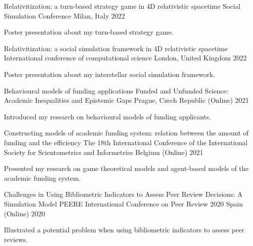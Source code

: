 \begin{cventries}
  \cventry
    {Relativitization: a turn-based strategy game in 4D relativistic spacetime} %
    {Social Simulation Conference} %
    {Milan, Italy} %
    {2022} %
    {
      \begin{cvitems} %
        \item {Poster presentation about my turn-based strategy game.}
      \end{cvitems}
    }

  \cventry
    {Relativitization: a social simulation framework in 4D relativistic spacetime} %
    {International conference of computational science} %
    {London, United Kingdom} %
    {2022} %
    {
      \begin{cvitems} %
        \item {Poster presentation about my interstellar social simulation framework.}
      \end{cvitems}
    }

  \cventry
    {Behavioural models of funding applications} %
    {Funded and Unfunded Science: Academic Inequalities and Epistemic Gaps} %
    {Prague, Czech Republic (Online)} %
    {2021} %
    {
      \begin{cvitems} %
        \item {Introduced my research on behavioural models of funding applicants.}
      \end{cvitems}
    }

  \cventry
    {Constructing models of academic funding system: relation between the amount of funding and the efficiency} %
    {The 18th International Conference of the International Society for Scientometrics and Informetrics} %
    {Belgium (Online)} %
    {2021} %
    {
      \begin{cvitems} %
        \item {Presented my research on game theoretical models and agent-based models of the academic funding system.}
      \end{cvitems}
    }

  \cventry
    {Challenges in Using Bibliometric Indicators to Assess Peer Review Decisions: A Simulation Model} %
    {PEERE International Conference on Peer Review 2020} %
    {Spain (Online)} %
    {2020} %
    {
      \begin{cvitems} %
        \item {Illustrated a potential problem when using bibliometric indicators to assess peer reviews.}
      \end{cvitems}
    }


\end{cventries}
